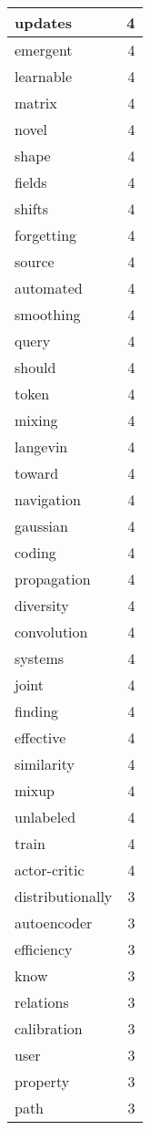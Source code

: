 \begin{table}[h]
\begin{tabular}{|l|r|}
\hline
updates & 4 \\
\hline
emergent & 4 \\
\hline
learnable & 4 \\
\hline
matrix & 4 \\
\hline
novel & 4 \\
\hline
shape & 4 \\
\hline
fields & 4 \\
\hline
shifts & 4 \\
\hline
forgetting & 4 \\
\hline
source & 4 \\
\hline
automated & 4 \\
\hline
smoothing & 4 \\
\hline
query & 4 \\
\hline
should & 4 \\
\hline
token & 4 \\
\hline
mixing & 4 \\
\hline
langevin & 4 \\
\hline
toward & 4 \\
\hline
navigation & 4 \\
\hline
gaussian & 4 \\
\hline
coding & 4 \\
\hline
propagation & 4 \\
\hline
diversity & 4 \\
\hline
convolution & 4 \\
\hline
systems & 4 \\
\hline
joint & 4 \\
\hline
finding & 4 \\
\hline
effective & 4 \\
\hline
similarity & 4 \\
\hline
mixup & 4 \\
\hline
unlabeled & 4 \\
\hline
train & 4 \\
\hline
actor-critic & 4 \\
\hline
distributionally & 3 \\
\hline
autoencoder & 3 \\
\hline
efficiency & 3 \\
\hline
know & 3 \\
\hline
relations & 3 \\
\hline
calibration & 3 \\
\hline
user & 3 \\
\hline
property & 3 \\
\hline
path & 3 \\

\end{tabular}
\end{table}
